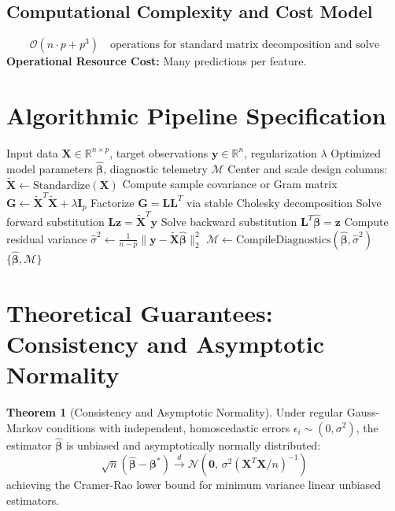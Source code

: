 \documentclass[11pt,a4paper]{article}
\theoremstyle{definition}
\newtheorem{theorem}{\textbf{Theorem}}[section]
\begin{document}
\subsection{Computational Complexity and Cost Model}
\begin{equation}
\mathcal{O}(n \cdot p + p^3) \quad \text{operations for standard matrix decomposition and solve}
\end{equation}
\textbf{Operational Resource Cost:} Many predictions per feature.

\section{Algorithmic Pipeline Specification}

\begin{algorithm}[H]
\caption{Partial dependence, ICE and accumulated local effects Execution}
\begin{algorithmic}[1]
\Require Input data $\mathbf{X} \in \mathbb{R}^{n \times p}$, target observations $\mathbf{y} \in \mathbb{R}^n$, regularization $\lambda$
\Ensure Optimized model parameters $\hat{\boldsymbol{\beta}}$, diagnostic telemetry $\mathcal{M}$
\State Center and scale design columns: $\tilde{\mathbf{X}} \gets \text{Standardize}(\mathbf{X})$
\State Compute sample covariance or Gram matrix $\mathbf{G} \gets \tilde{\mathbf{X}}^T \tilde{\mathbf{X}} + \lambda \mathbf{I}_p$
\State Factorize $\mathbf{G} = \mathbf{L} \mathbf{L}^T$ via stable Cholesky decomposition
\State Solve forward substitution $\mathbf{L} \mathbf{z} = \tilde{\mathbf{X}}^T \mathbf{y}$
\State Solve backward substitution $\mathbf{L}^T \hat{\boldsymbol{\beta}} = \mathbf{z}$
\State Compute residual variance $\hat{\sigma}^2 \gets \frac{1}{n - p} \| \mathbf{y} - \tilde{\mathbf{X}} \hat{\boldsymbol{\beta}} \|_2^2$
\State $\mathcal{M} \gets \text{CompileDiagnostics}(\hat{\boldsymbol{\beta}}, \hat{\sigma}^2)$
\State \Return $\{\hat{\boldsymbol{\beta}}, \mathcal{M}\}$
\end{algorithmic}
\end{algorithm}

\section{Theoretical Guarantees: Consistency and Asymptotic Normality}

\begin{theorem}[Consistency and Asymptotic Normality]
Under regular Gauss-Markov conditions with independent, homoscedastic errors $\epsilon_i \sim (0, \sigma^2)$, the estimator $\hat{\boldsymbol{\beta}}$ is unbiased and asymptotically normally distributed:
\begin{equation}
\sqrt{n}(\hat{\boldsymbol{\beta}} - \boldsymbol{\beta}^*) \xrightarrow{d} \mathcal{N}\left(\mathbf{0}, \, \sigma^2 (\mathbf{X}^T \mathbf{X} / n)^{-1}\right)
\end{equation}
achieving the Cramer-Rao lower bound for minimum variance linear unbiased estimators.
\end{theorem}
\end{document}

